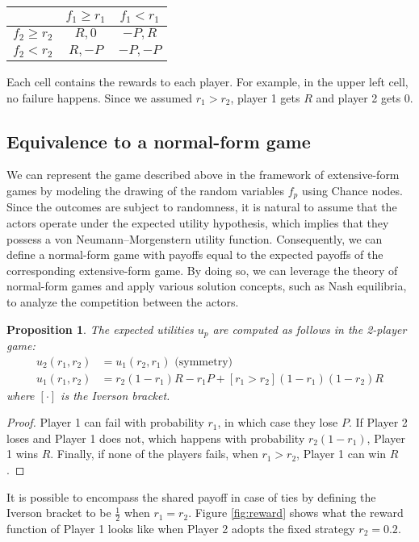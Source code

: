 \documentclass[preprint,12pt,authoryear]{elsarticle}
\newtheorem{proposition}[theorem]{Proposition}
\theoremstyle{definition}
\begin{document}
\begin{center}
\begin{tabular}{|c|c|c|}
\cline{2-3}
\multicolumn{1}{c|}{} & $f_1\ge r_1$ & $f_1<r_1$ \\
\hline
$f_2\ge r_2$ & $R, 0$ & $-P, R$ \\
\hline
$f_2<r_2$ & $R, -P$ &  $-P, -P$ \\
\hline
\end{tabular}
\end{center}


Each cell contains the rewards to each player. For example, in the upper left cell, no failure happens. Since we assumed $r_1 > r_2$, player 1 gets $R$ and player 2 gets $0$.

\subsection{Equivalence to a normal-form game}

We can represent the game described above in the framework of extensive-form games by modeling the drawing of the random variables $f_p$ using Chance nodes. Since the outcomes are subject to randomness, it is natural to assume that the actors operate under the expected utility hypothesis, which implies that they possess a von Neumann–Morgenstern utility function. Consequently, we can define a normal-form game with payoffs equal to the expected payoffs of the corresponding extensive-form game. By doing so, we can leverage the theory of normal-form games and apply various solution concepts, such as Nash equilibria, to analyze the competition between the actors.
\begin{proposition}
The expected utilities $u_p$ are computed as follows in the 2-player game:
\begin{align*}
    u_2(r_1, r_2) &= u_1(r_2, r_1) \text{~(symmetry)}\\
    u_1(r_1, r_2) &= r_2 (1-r_1) R - r_1 P + [ r_1 > r_2 ] (1-r_1)(1-r_2) R
\end{align*}
where $[ \cdot ]$ is the Iverson bracket.
\end{proposition}
\begin{proof}
Player 1 can fail with probability $r_1$, in which case they lose $P$. If Player 2 loses and Player 1 does not, which happens with probability $r_2(1-r_1)$, Player 1 wins $R$. Finally, if none of the players fails, when $r_1 > r_2$, Player 1 can win $R$.
\end{proof}

It is possible to encompass the shared payoff in case of ties by defining the Iverson bracket to be $\frac{1}{2}$ when $r_1 = r_2$.
Figure \ref{fig:reward} shows what the reward function of Player 1 looks like when Player 2 adopts the fixed strategy $r_2=0.2$.
\end{document}
